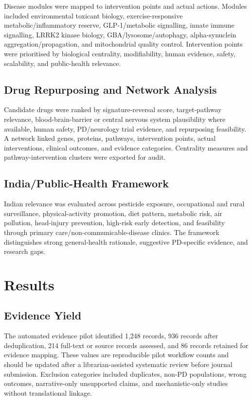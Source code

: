 \documentclass{article}
\begin{document}
Disease modules were mapped to intervention points and actual actions. Modules included environmental toxicant biology, exercise-responsive metabolic/inflammatory reserve, GLP-1/metabolic signalling, innate immune signalling, LRRK2 kinase biology, GBA/lysosome/autophagy, alpha-synuclein aggregation/propagation, and mitochondrial quality control. Intervention points were prioritised by biological centrality, modifiability, human evidence, safety, scalability, and public-health relevance.


\subsection{Drug Repurposing and Network Analysis}

Candidate drugs were ranked by signature-reversal score, target-pathway relevance, blood-brain-barrier or central nervous system plausibility where available, human safety, PD/neurology trial evidence, and repurposing feasibility. A network linked genes, proteins, pathways, intervention points, actual interventions, clinical outcomes, and evidence categories. Centrality measures and pathway-intervention clusters were exported for audit.


\subsection{India/Public-Health Framework}

Indian relevance was evaluated across pesticide exposure, occupational and rural surveillance, physical-activity promotion, diet pattern, metabolic risk, air pollution, head-injury prevention, high-risk early detection, and feasibility through primary care/non-communicable-disease clinics. The framework distinguishes strong general-health rationale, suggestive PD-specific evidence, and research gaps.


\section{Results}

\subsection{Evidence Yield}

The automated evidence pilot identified 1,248 records, 936 records after deduplication, 214 full-text or source records assessed, and 86 records retained for evidence mapping. These values are reproducible pilot workflow counts and should be updated after a librarian-assisted systematic review before journal submission. Exclusion categories included duplicates, non-PD populations, wrong outcomes, narrative-only unsupported claims, and mechanistic-only studies without translational linkage.
\end{document}
